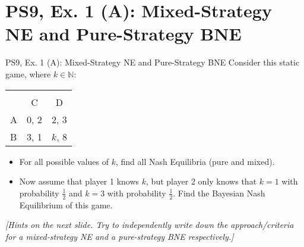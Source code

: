 \section{PS9, Ex. 1 (A): Mixed-Strategy NE and Pure-Strategy BNE}

\begin{frame}{PS9, Ex. 1 (A): Mixed-Strategy NE and Pure-Strategy BNE}
    Consider this static game, where $k\in\mathbb{N}:$
    \vspace{-8pt}
    \begin{table}
      \begin{tabular}{l|c|c|}
        \multicolumn{1}{c}{} & \multicolumn{2}{c}{} \\
        \multicolumn{1}{c}{} & \multicolumn{1}{c}{C} & \multicolumn{1}{c}{D} \\\cline{2-3}
        A & 0, 2 & 2, 3 \\\cline{2-3}
        B & 3, 1 & $k$, 8 \\\cline{2-3}
      \end{tabular}
    \end{table}
    \begin{itemize}
      \item[(a)] For all possible values of $k$, find all Nash Equilibria (pure and mixed).
      \item[(b)] Now assume that player 1 knows $k$, but player 2 only knows that $k = 1$ with probability $\frac{1}{2}$ and $k = 3$ with probability $\frac{1}{2}$. Find the Bayesian Nash Equilibrium of this game.
    \end{itemize}
    \textit{[Hints on the next slide. Try to independently write down the approach/criteria for a mixed-strategy NE and a pure-strategy BNE respectively.]}
    \vfill\null
\end{frame}
